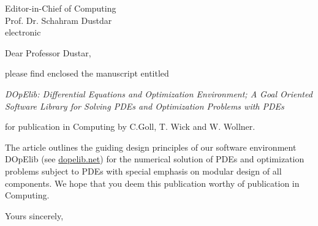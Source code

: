 \documentclass{uhhbrief-fak6}    %
\date{\today}
\begin{document}
\begin{letter}{Editor-in-Chief of Computing\\Prof. Dr. Schahram Dustdar\\[\baselineskip]
    electronic}

\subject{Paper Submission}

\opening{Dear Professor Dustar,}

please find enclosed the manuscript entitled

{\em DOpElib: Differential Equations and Optimization Environment; A Goal Oriented Software Library for Solving PDEs and Optimization Problems with PDEs}

for publication in Computing by
C.Goll, T. Wick and W. Wollner.

The article outlines the guiding design principles of our software environment
DOpElib (see \url{dopelib.net}) for the numerical solution of PDEs and optimization problems subject 
to PDEs with special emphasis on modular design of all components. 
We hope that you deem this publication worthy of publication in Computing.

\closing{Yours sincerely,}




\end{letter}
\end{document}
